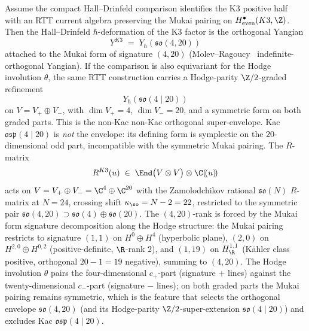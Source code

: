 \begin{theorem}
\label{gluing:thm:k3-super-yangian-osp}
Assume the compact Hall--Drinfeld comparison identifies the K3
positive half with an RTT current algebra preserving the Mukai pairing
on \(H^\bullet_{\mathrm{even}}(K3,\Z)\). Then the Hall--Drinfeld
\(\hbar\)-deformation of the K3 factor is the
orthogonal Yangian
\[
 Y^{K3} \;=\; Y_\hbar(\mathfrak{so}(4, 20))
\]
attached to the Mukai form of signature $(4, 20)$
\textup{(}Molev--Ragoucy~\cite{MolevRagoucy2008} indefinite-orthogonal
Yangian\textup{)}. If the comparison is also equivariant for the Hodge
involution \(\theta\), the same RTT construction carries a
Hodge-parity \(\Z/2\)-graded refinement
\[
 Y_\hbar(\mathfrak{so}(4 \mid 20))
\]
on \(V=V_+\oplus V_-\), with \(\dim V_+=4\), \(\dim V_-=20\), and a
symmetric form on both graded parts. This is the non-Kac
non-Kac orthogonal super-envelope. Kac
$\mathfrak{osp}(4 \mid 20)$ is \emph{not} the envelope: its defining
form is symplectic on the $20$-dimensional odd part, incompatible
with the symmetric Mukai pairing. The $R$-matrix
\[
 R^{K3}(u) \;\in\; \End\bigl(V \otimes V\bigr) \otimes \C(\!(u)\!)
\]
acts on $V = V_+ \oplus V_- = \C^4 \oplus \C^{20}$ with the
Zamolodchikov rational $\mathfrak{so}(N)$ $R$-matrix at $N = 24$,
crossing shift $\kappa_{\so} = N - 2 = 22$, restricted to the
symmetric pair $\mathfrak{so}(4, 20) \supset \mathfrak{so}(4) \oplus
\mathfrak{so}(20)$. The $(4, 20)$-rank is forced by the Mukai form
signature decomposition along the Hodge structure:
the Mukai pairing restricts to signature $(1, 1)$ on $H^0 \oplus H^4$
(hyperbolic plane), $(2, 0)$ on $H^{2, 0} \oplus H^{0, 2}$
(positive-definite, $\R$-rank $2$), and $(1, 19)$ on
$H^{1, 1}_\R$ (K\"ahler class positive, orthogonal $20 - 1 = 19$
negative), summing to $(4, 20)$. The Hodge involution $\theta$ pairs
the four-dimensional $c_+$-part (signature $+$ lines) against the
twenty-dimensional $c_-$-part (signature $-$ lines); on both graded
parts the Mukai pairing remains symmetric, which is the feature that
selects the orthogonal envelope $\mathfrak{so}(4, 20)$ (and its
Hodge-parity $\Z/2$-super-extension $\mathfrak{so}(4 \mid 20)$) and
excludes Kac $\mathfrak{osp}(4 \mid 20)$.
\end{theorem}

